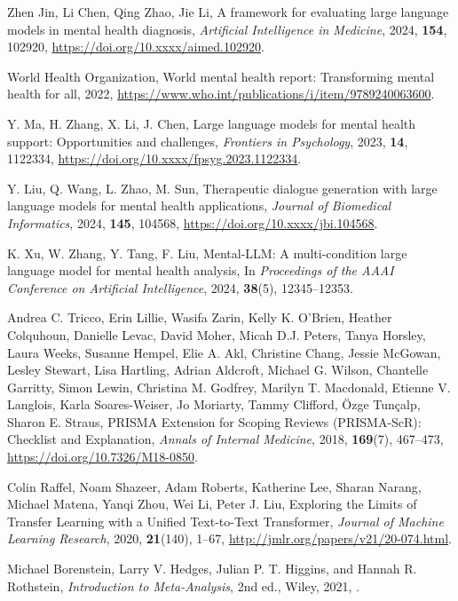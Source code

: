 \documentclass[journal]{IEEEtran}
\begin{document}
\begin{thebibliography}{99}
Zhen Jin, Li Chen, Qing Zhao, Jie Li,
A framework for evaluating large language models in mental health diagnosis,
\textit{Artificial Intelligence in Medicine}, 2024, \textbf{154}, 102920,
\url{https://doi.org/10.xxxx/aimed.102920}.

World Health Organization,
World mental health report: Transforming mental health for all,
2022,
\url{https://www.who.int/publications/i/item/9789240063600}.

Y. Ma, H. Zhang, X. Li, J. Chen,
Large language models for mental health support: Opportunities and challenges,
\textit{Frontiers in Psychology}, 2023, \textbf{14}, 1122334,
\url{https://doi.org/10.xxxx/fpsyg.2023.1122334}.

Y. Liu, Q. Wang, L. Zhao, M. Sun,
Therapeutic dialogue generation with large language models for mental health applications,
\textit{Journal of Biomedical Informatics}, 2024, \textbf{145}, 104568,
\url{https://doi.org/10.xxxx/jbi.104568}.

K. Xu, W. Zhang, Y. Tang, F. Liu,
Mental-LLM: A multi-condition large language model for mental health analysis,
In \textit{Proceedings of the AAAI Conference on Artificial Intelligence}, 2024, \textbf{38}(5), 12345--12353.

Andrea C. Tricco, Erin Lillie, Wasifa Zarin, Kelly K. O'Brien, Heather Colquhoun, Danielle Levac, David Moher, Micah D.J. Peters, Tanya Horsley, Laura Weeks, Susanne Hempel, Elie A. Akl, Christine Chang, Jessie McGowan, Lesley Stewart, Lisa Hartling, Adrian Aldcroft, Michael G. Wilson, Chantelle Garritty, Simon Lewin, Christina M. Godfrey, Marilyn T. Macdonald, Etienne V. Langlois, Karla Soares-Weiser, Jo Moriarty, Tammy Clifford, {\"O}zge Tun{\c{c}}alp, Sharon E. Straus,  
PRISMA Extension for Scoping Reviews (PRISMA-ScR): Checklist and Explanation,  
\textit{Annals of Internal Medicine}, 2018, \textbf{169}(7), 467--473,  
\url{https://doi.org/10.7326/M18-0850}.

Colin Raffel, Noam Shazeer, Adam Roberts, Katherine Lee, Sharan Narang, Michael Matena, Yanqi Zhou, Wei Li, Peter J. Liu,  
Exploring the Limits of Transfer Learning with a Unified Text-to-Text Transformer,  
\textit{Journal of Machine Learning Research}, 2020, \textbf{21}(140), 1--67,  
\url{http://jmlr.org/papers/v21/20-074.html}.

Michael Borenstein, Larry V. Hedges, Julian P. T. Higgins, and Hannah R. Rothstein, 
\textit{Introduction to Meta-Analysis}, 2nd ed., Wiley, 2021, .


\end{thebibliography}
\end{document}
